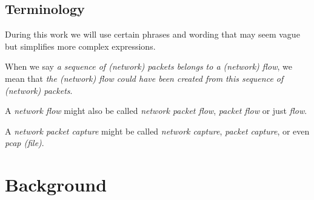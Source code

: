 \documentclass[
	ngerman,
	ruledheaders=section,%
	class=report,%
	thesis={type=bachelor},%
	accentcolor=9c,%
	custommargins=true,%
	marginpar=false,%
	parskip=half-,%
	fontsize=11pt,%
]{tudapub}
\begin{document}
\section{Terminology}
\label{sec:terminology}

During this work we will use certain phrases and wording that may seem vague but simplifies more complex expressions.

When we say \textit{a sequence of (network) packets belongs to a (network) flow}, we mean that \textit{the (network) flow could have been created from this sequence of (network) packets}.

A \textit{network flow} might also be called \textit{network packet flow}, \textit{packet flow} or just \textit{flow}.

A \textit{network packet capture} might be called \textit{network capture}, \textit{packet capture}, or even \textit{pcap (file)}.

\chapter{Background}
\label{sec:background}


%
%
\end{document}
